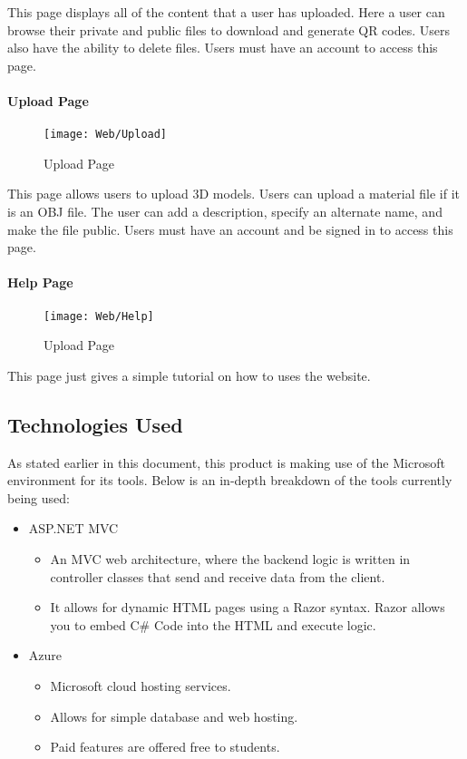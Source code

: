         This page displays all of the content that a user has uploaded. Here a user can browse their private and public files to download and generate QR codes. Users also have the ability to delete files. Users must have an account to access this page.

    \paragraph{Upload Page}
        \begin{figure}[H]
        \texttt{[image: Web/Upload]}
        \centering
        \caption{Upload Page}
        \label{fig:UploadPage}
        \end{figure}

        This page allows users to upload 3D models. Users can upload a material file if it is an OBJ file. The user can add a description, specify an alternate name, and make the file public. Users must have an account and be signed in to access this page.

    \paragraph{Help Page}
        \begin{figure}[H]
        \texttt{[image: Web/Help]}
        \centering
        \caption{Upload Page}
        \label{fig:HelpPage}
        \end{figure}
    
        This page just gives a simple tutorial on how to uses the website.

\subsection{Technologies Used}

    As stated earlier in this document, this product is making use
    of the Microsoft environment for its tools. Below is an in-depth 
    breakdown of the tools currently being used:

    \begin{itemize}
    \item ASP.NET MVC
    \begin{itemize}
        \item An MVC web architecture, where the backend logic is written in controller classes
        that send and receive data from the client.
        \item It allows for dynamic HTML pages using a Razor syntax. Razor allows
        you to embed C\# Code into the HTML and execute logic.
    \end{itemize}
    
    \item Azure
        \begin{itemize}
            \item Microsoft cloud hosting services.
            \item Allows for simple database and web hosting.
            \item Paid features are offered free to students.
        \end{itemize}
    \end{itemize}

